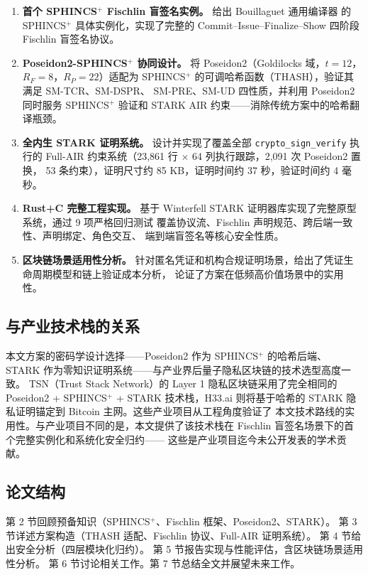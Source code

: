 \documentclass[11pt,a4paper]{ctexart}
\begin{document}
\begin{enumerate}[label=\textbf{C\arabic*},leftmargin=*]
\item \textbf{首个 SPHINCS$^+$ Fischlin 盲签名实例。}
给出 Bouillaguet 通用编译器 \cite{Bouillaguet2026BlindingPH}
的 SPHINCS$^+$ 具体实例化，实现了完整的 Commit--Issue--Finalize--Show
四阶段 Fischlin 盲签名协议。
\item \textbf{Poseidon2-SPHINCS$^+$ 协同设计。}
将 Poseidon2（Goldilocks 域，$t=12$，$R_F=8$，$R_P=22$）适配为
SPHINCS$^+$ 的可调哈希函数（THASH），验证其满足 SM-TCR、SM-DSPR、
SM-PRE、SM-UD 四性质，并利用 Poseidon2 同时服务 SPHINCS$^+$ 验证和
STARK AIR 约束——消除传统方案中的哈希翻译瓶颈。
\item \textbf{全内生 STARK 证明系统。}
设计并实现了覆盖全部 \texttt{crypto\_sign\_verify} 执行的 Full-AIR
约束系统（23,861 行 $\times$ 64 列执行跟踪，2,091 次 Poseidon2 置换，
53 条约束），证明尺寸约 85 KB，证明时间约 37 秒，验证时间约 4 毫秒。
\item \textbf{Rust+C 完整工程实现。}
基于 Winterfell STARK 证明器库实现了完整原型系统，通过 9 项严格回归测试
覆盖协议流、Fischlin 声明规范、跨后端一致性、声明绑定、角色交互、
端到端盲签名等核心安全性质。
\item \textbf{区块链场景适用性分析。}
针对匿名凭证和机构合规证明场景，给出了凭证生命周期模型和链上验证成本分析，
论证了方案在低频高价值场景中的实用性。
\end{enumerate}

\subsection{与产业技术栈的关系}

本文方案的密码学设计选择——Poseidon2 作为 SPHINCS$^+$ 的哈希后端、
STARK 作为零知识证明系统——与产业界后量子隐私区块链的技术选型高度一致。
TSN（Trust Stack Network）的 Layer 1 隐私区块链采用了完全相同的
Poseidon2 + SPHINCS$^+$ + STARK 技术栈，H33.ai 则将基于哈希的
STARK 隐私证明锚定到 Bitcoin 主网。这些产业项目从工程角度验证了
本文技术路线的实用性。与产业项目不同的是，本文提供了该技术栈在
Fischlin 盲签名场景下的首个完整实例化和系统化安全归约——
这些是产业项目迄今未公开发表的学术贡献。

\subsection{论文结构}

第 2 节回顾预备知识（SPHINCS$^+$、Fischlin 框架、Poseidon2、STARK）。
第 3 节详述方案构造（THASH 适配、Fischlin 协议、Full-AIR 证明系统）。
第 4 节给出安全分析（四层模块化归约）。
第 5 节报告实现与性能评估，含区块链场景适用性分析。
第 6 节讨论相关工作。第 7 节总结全文并展望未来工作。
\end{document}
